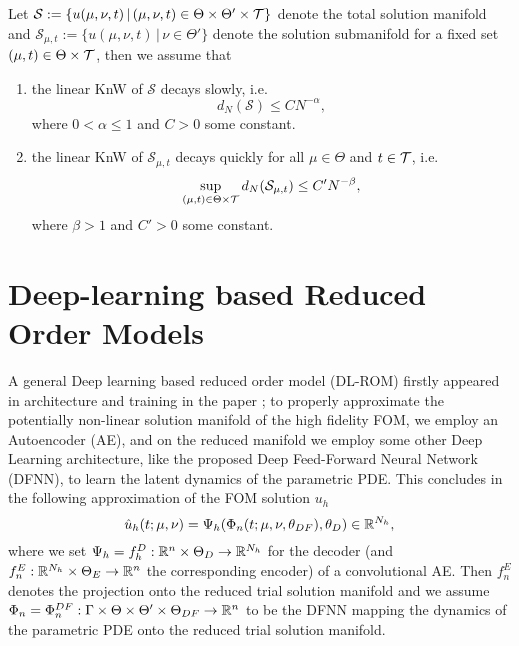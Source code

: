 \begin{assumption} \label{assumption KnW decay}
    Let $\mathcal{S} := \{ u(\mu, \nu, t) \, \vert \, (\mu, \nu, t) \in \Theta \times \Theta' \times \mathcal{T} \}$ denote the total solution manifold and $\mathcal{S}_{\mu, t} := \{ u(\mu, \nu, t) \, \vert \, \nu \in \Theta' \}$ denote the solution submanifold for a fixed set $(\mu, t) \in \Theta \times \mathcal{T}$, then we assume that
    \begin{enumerate}
        \item the linear KnW of $\mathcal{S}$ decays slowly, i.e. 
        \begin{equation*}
            d_N(\mathcal{S}) \leq C N^{-\alpha},
        \end{equation*}
        where $0 < \alpha \leq 1$ and $C > 0$ some constant.
        \item the linear KnW of $\mathcal{S}_{\mu, t}$ decays quickly for all $\mu \in \Theta$ and $t \in \mathcal{T}$, i.e. 
        \begin{equation*}
            \sup_{(\mu, t) \in \Theta \times \mathcal{T}} d_N(\mathcal{S}_{\mu, t}) \leq C' N^{-\beta},    
        \end{equation*}
        where $\beta > 1$ and $C' > 0$ some constant.
    \end{enumerate}
\end{assumption}


\section{Deep-learning based Reduced Order Models}


A general Deep learning based reduced order model (DL-ROM) firstly appeared in architecture and training in the paper \cite{DL-ROM}; to properly approximate the potentially non-linear solution manifold of the high fidelity FOM, we employ an Autoencoder (AE), and on the reduced manifold we employ some other Deep Learning architecture, like the proposed Deep Feed-Forward Neural Network (DFNN), to learn the latent dynamics of the parametric PDE. This concludes in the following approximation of the FOM solution $u_h$
\begin{equation}
    \hat{u}_h(t; \mu, \nu) = \Psi_h(\Phi_n(t; \mu, \nu, \theta_{DF}), \theta_{D}) \in \mathbb{R}^{N_h},
\end{equation}
where we set $\Psi_h = f^D_h : \mathbb{R}^n \times \Theta_D \to \mathbb{R}^{N_h}$ for the decoder (and $f^E_n: \mathbb{R}^{N_h} \times \Theta_E \to \mathbb{R}^n$ the corresponding encoder) of a convolutional AE. Then $f^E_n$ denotes the projection onto the reduced trial solution manifold and we assume $\Phi_n = \Phi_n^{DF} : \Gamma \times \Theta \times \Theta' \times \Theta_{DF} \to \mathbb{R}^n$ to be the DFNN mapping the dynamics of the parametric PDE onto the reduced trial solution manifold.

